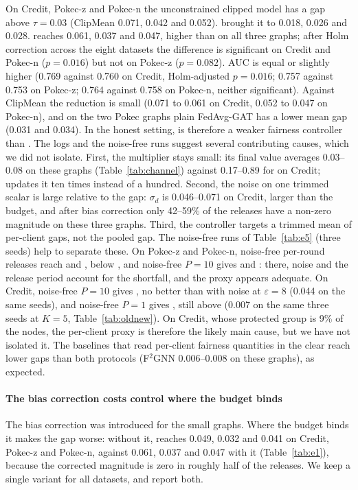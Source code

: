 On Credit, Pokec-z and Pokec-n the unconstrained clipped model has a gap above $\tau=0.03$ (ClipMean 0.071, 0.042 and 0.052). \clamp{} brought it to 0.018, 0.026 and 0.028. \rt{} reaches 0.061, 0.037 and 0.047, higher than \clamp{} on all three graphs; after Holm correction across the eight datasets the difference is significant on Credit and Pokec-n ($p=0.016$) but not on Pokec-z ($p=0.082$). AUC is equal or slightly higher (0.769 against 0.760 on Credit, Holm-adjusted $p=0.016$; 0.757 against 0.753 on Pokec-z; 0.764 against 0.758 on Pokec-n, neither significant). Against ClipMean the reduction is small (0.071 to 0.061 on Credit, 0.052 to 0.047 on Pokec-n), and on the two Pokec graphs plain FedAvg-GAT has a lower mean gap (0.031 and 0.034). In the honest setting, \rt{} is therefore a weaker fairness controller than \clamp{}. The logs and the noise-free runs suggest several contributing causes, which we did not isolate. First, the multiplier stays small: its final value averages 0.03--0.08 on these graphs (Table~\ref{tab:channel}) against 0.17--0.89 for \clamp{} on Credit; \rt{} updates it ten times instead of a hundred. Second, the noise on one trimmed scalar is large relative to the gap: $\sigma_d$ is 0.046--0.071 on Credit, larger than the budget, and after bias correction only 42--59\% of the releases have a non-zero magnitude on these three graphs. Third, the controller targets a trimmed mean of per-client gaps, not the pooled gap. The noise-free runs of Table~\ref{tab:e5} (three seeds) help to separate these. On Pokec-z and Pokec-n, noise-free per-round releases reach \nfPokeczPone{} and \nfPokecnPone{}, below \clamp{}, and noise-free $P=10$ gives \nfPokeczPten{} and \nfPokecnPten{}: there, noise and the release period account for the shortfall, and the proxy appears adequate. On Credit, noise-free $P=10$ gives \nfCreditPten{}, no better than with noise at $\varepsilon=8$ (0.044 on the same seeds), and noise-free $P=1$ gives \nfCreditPone{}, still above \clamp{} (0.007 on the same three seeds at $K=5$, Table~\ref{tab:oldnew}). On Credit, whose protected group is 9\% of the nodes, the per-client proxy is therefore the likely main cause, but we have not isolated it. The baselines that read per-client fairness quantities in the clear reach lower gaps than both protocols (F$^2$GNN 0.006--0.008 on these graphs), as expected.

\paragraph{The bias correction costs control where the budget binds}
The bias correction was introduced for the small graphs. Where the budget binds it makes the gap worse: without it, \rt{} reaches 0.049, 0.032 and 0.041 on Credit, Pokec-z and Pokec-n, against 0.061, 0.037 and 0.047 with it (Table~\ref{tab:e1}), because the corrected magnitude is zero in roughly half of the releases. We keep a single variant for all datasets, and report both.

